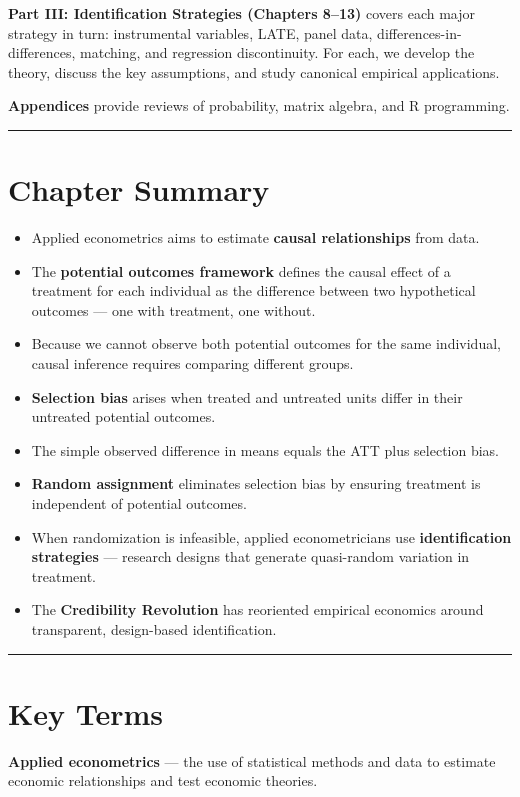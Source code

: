 \textbf{Part III: Identification Strategies (Chapters 8--13)} covers each major strategy in turn: instrumental variables, LATE, panel data, differences-in-differences, matching, and regression discontinuity. For each, we develop the theory, discuss the key assumptions, and study canonical empirical applications.

\textbf{Appendices} provide reviews of probability, matrix algebra, and R programming.

\medskip\hrule\medskip

\section{Chapter Summary}

\begin{itemize}
\item Applied econometrics aims to estimate \textbf{causal relationships} from data.
\item The \textbf{potential outcomes framework} defines the causal effect of a treatment for each individual as the difference between two hypothetical outcomes --- one with treatment, one without.
\item Because we cannot observe both potential outcomes for the same individual, causal inference requires comparing different groups.
\item \textbf{Selection bias} arises when treated and untreated units differ in their untreated potential outcomes.
\item The simple observed difference in means equals the ATT plus selection bias.
\item \textbf{Random assignment} eliminates selection bias by ensuring treatment is independent of potential outcomes.
\item When randomization is infeasible, applied econometricians use \textbf{identification strategies} --- research designs that generate quasi-random variation in treatment.
\item The \textbf{Credibility Revolution} has reoriented empirical economics around transparent, design-based identification.
\end{itemize}

\medskip\hrule\medskip

\section{Key Terms}

\textbf{Applied econometrics} --- the use of statistical methods and data to estimate economic relationships and test economic theories.

